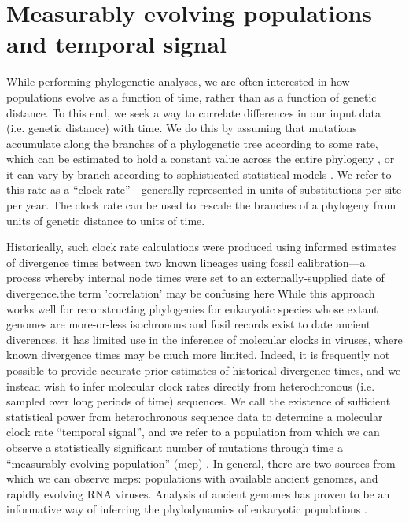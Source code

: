 \section{Measurably evolving populations and temporal signal}

While performing phylogenetic analyses, we are often interested in how populations evolve as a function of time, rather than as a function of genetic distance.
To this end, we seek a way to correlate differences in our input data (i.e. genetic distance) with time.
We do this by assuming that mutations accumulate along the branches of a phylogenetic tree according to some rate, which can be estimated to hold a constant value across the entire phylogeny \cite{Brown2011}, or it can vary by branch according to sophisticated statistical models \cite{Drummond2006relaxed, Drummond2010randomLocal}.
We refer to this rate as a ``clock rate''---generally represented in units of substitutions per site per year.
The clock rate can be used to rescale the branches of a phylogeny from units of genetic distance to units of time.

Historically, such clock rate calculations were produced using informed estimates of divergence times between two known lineages using fossil calibration\cite{smith2010birds, near2005turtles}---a process whereby internal node times were set to an externally-supplied date of divergence.the term 'correlation' may be confusing here
While this approach works well for reconstructing phylogenies for eukaryotic species whose extant genomes are more-or-less isochronous and fosil records exist to date ancient diverences, it has limited use in the inference of molecular clocks in viruses, where known divergence times may be much more limited.
Indeed, it is frequently not possible to provide accurate prior estimates of historical divergence times, and we instead wish to infer molecular clock rates directly from heterochronous (i.e. sampled over long periods of time) sequences.
We call the existence of sufficient statistical power from heterochronous sequence data to determine a molecular clock rate ``temporal signal'', and we refer to a population from which we can observe a statistically significant number of mutations through time a ``measurably evolving population'' (\gls{mep}) \cite{drummond2003measurably}. %
In general, there are two sources from which we can observe \gls{mep}s: populations with available ancient genomes, and rapidly evolving RNA viruses.
Analysis of ancient genomes has proven to be an informative way of inferring the phylodynamics of eukaryotic populations \cite{shapiro2004bison}. %



